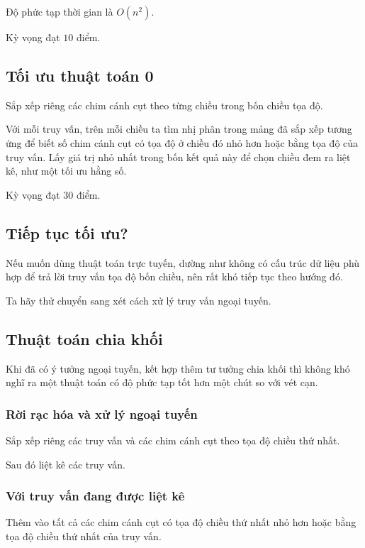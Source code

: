 \documentclass[11pt]{article}
\begin{document}
Độ phức tạp thời gian là \(O(n^2)\).

Kỳ vọng đạt \(10\) điểm.

\subsection{Tối ưu thuật toán 0}

Sắp xếp riêng các chim cánh cụt theo từng chiều trong bốn chiều tọa độ.

Với mỗi truy vấn, trên mỗi chiều ta tìm nhị phân trong mảng đã sắp xếp tương
ứng để biết số chim cánh cụt có tọa độ ở chiều đó nhỏ hơn hoặc bằng tọa độ
của truy vấn. Lấy giá trị nhỏ nhất trong bốn kết quả này để chọn chiều đem
ra liệt kê, như một tối ưu hằng số.

Kỳ vọng đạt \(30\) điểm.

\subsection{Tiếp tục tối ưu?}

Nếu muốn dùng thuật toán trực tuyến, dường như không có cấu trúc dữ liệu phù
hợp để trả lời truy vấn tọa độ bốn chiều, nên rất khó tiếp tục theo hướng đó.

Ta hãy thử chuyển sang xét cách xử lý truy vấn ngoại tuyến.

\subsection{Thuật toán chia khối}

Khi đã có ý tưởng ngoại tuyến, kết hợp thêm tư tưởng chia khối thì không khó
nghĩ ra một thuật toán có độ phức tạp tốt hơn một chút so với vét cạn.

\subsubsection{Rời rạc hóa và xử lý ngoại tuyến}

Sắp xếp riêng các truy vấn và các chim cánh cụt theo tọa độ chiều thứ nhất.

Sau đó liệt kê các truy vấn.

\subsubsection{Với truy vấn đang được liệt kê}

Thêm vào tất cả các chim cánh cụt có tọa độ chiều thứ nhất nhỏ hơn hoặc bằng
tọa độ chiều thứ nhất của truy vấn.
\end{document}
